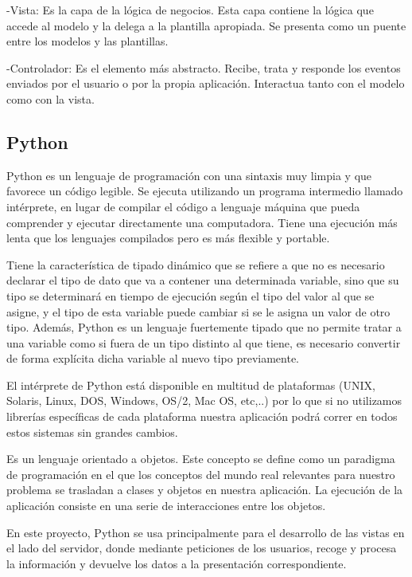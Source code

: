 \documentclass[a4paper, 12pt]{book}
\begin{document}
-Vista: Es la capa de la l\'ogica de negocios. Esta capa contiene la l\'ogica que accede al modelo y la delega a la plantilla apropiada. Se presenta 
como un puente entre los modelos y las plantillas.

-Controlador: Es el elemento m\'as abstracto. Recibe, trata y responde los eventos enviados por el usuario o por la propia aplicaci\'on. Interactua 
tanto con el modelo como con la vista.



\subsection{Python} 
\label{subsec:python}
Python es un lenguaje de programaci\'on con una sintaxis muy limpia y que favorece un c\'odigo legible. Se ejecuta utilizando un programa intermedio 
llamado int\'erprete, en lugar de compilar el c\'odigo a lenguaje m\'aquina que pueda comprender
y ejecutar directamente una computadora. Tiene una ejecuci\'on m\'as lenta que los lenguajes compilados pero es m\'as flexible y portable.

Tiene la caracter\'istica de tipado din\'amico que se refiere a que no es necesario declarar el tipo de dato que va a contener una determinada 
variable, sino que su tipo se determinar\'a en tiempo de ejecuci\'on seg\'un el tipo del valor al que se asigne, y el tipo de esta variable puede 
cambiar si se le asigna un valor de otro tipo. Adem\'as, Python es un lenguaje fuertemente tipado que no permite tratar a una variable como si fuera 
de un tipo distinto al que tiene, es necesario convertir de forma expl\'icita dicha variable al nuevo tipo previamente. 

El int\'erprete de Python est\'a disponible en multitud de plataformas (UNIX, Solaris, Linux, DOS, Windows, OS/2, Mac OS, etc,..) 
por lo que si no utilizamos librer\'ias espec\'ificas de cada plataforma nuestra aplicaci\'on podr\'a correr en todos estos sistemas sin grandes 
cambios.

Es un lenguaje orientado a objetos. Este concepto se define como un paradigma de programaci\'on en el que los conceptos del mundo real relevantes 
para nuestro problema se trasladan a clases y objetos en nuestra aplicaci\'on. La ejecuci\'on de la aplicaci\'on consiste en una serie de interacciones 
entre los objetos.

En este proyecto, Python se usa principalmente para el desarrollo de las vistas en el lado del servidor, donde mediante 
peticiones de los usuarios, recoge y procesa la informaci\'on y devuelve los datos a la presentaci\'on correspondiente.
\end{document}

